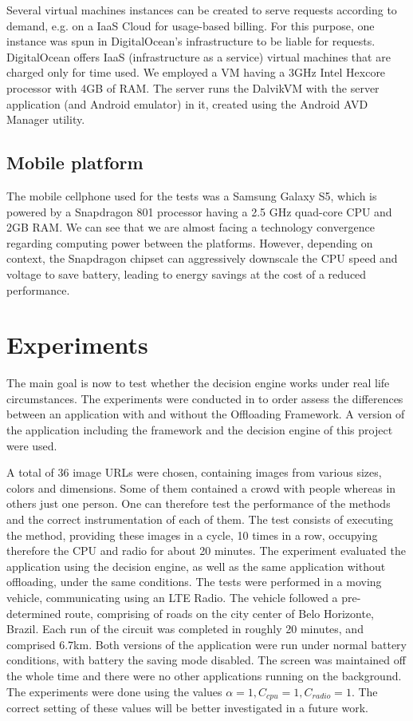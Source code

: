 \documentclass[10pt, conference, letterpaper]{IEEEtran}
\begin{document}
  Several virtual machines instances can be created to serve requests according to demand, e.g. on a IaaS Cloud for usage-based billing. For this purpose, one instance was spun in DigitalOcean's infrastructure \cite{digitalocean} to be liable for requests. DigitalOcean offers IaaS (infrastructure as a service) virtual machines that are charged only for time used. We employed a VM having a 3GHz Intel Hexcore processor with 4GB of RAM. The server runs the DalvikVM with the server application (and Android emulator) in it, created using the Android AVD Manager \cite{androidavd} utility.

\subsection{Mobile platform}

  The mobile cellphone used for the tests was a Samsung Galaxy S5, which is powered by a Snapdragon 801 processor having a 2.5 GHz quad-core CPU and 2GB RAM. We can see that we are almost facing a technology convergence regarding computing power between the platforms. However, depending on context, the Snapdragon chipset can aggressively downscale the CPU speed and voltage to save battery, leading to energy savings at the cost of a reduced performance.

\section{Experiments}
\label{sec:experiments}
  
  The main goal is now to test whether the decision engine works under real life circumstances. The experiments were conducted in to order assess the differences between an application with and without the Offloading Framework. A version of the application including the framework and the decision engine of this project were used.

  A total of 36 image URLs were chosen, containing images from various sizes, colors and dimensions. Some of them contained a crowd with people whereas in others just one person. One can therefore test the performance of the methods and the correct instrumentation of each of them. The test consists of executing the method, providing these images in a cycle, 10 times in a row, occupying therefore the CPU and radio for about 20 minutes. The experiment evaluated the application using the decision engine, as well as the same application without offloading, under the same conditions. The tests were performed in a moving vehicle, communicating using an LTE Radio. The vehicle followed a pre-determined route, comprising of roads on the city center of Belo Horizonte, Brazil. Each run of the circuit was completed in roughly 20 minutes, and comprised 6.7km. Both versions of the application were run under normal battery conditions, with battery the saving mode disabled. The screen was maintained off the whole time and there were no other applications running on the background. The experiments were done using the values $\alpha = 1, C_{cpu} = 1, C_{radio} = 1$. The correct setting of these values will be better investigated in a future work.
\end{document}
